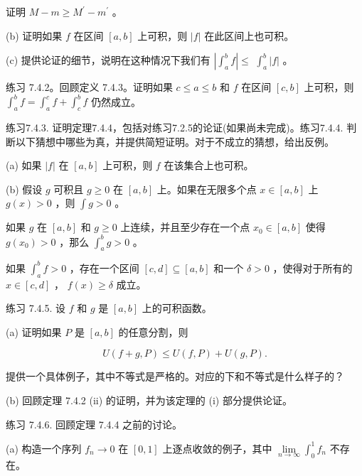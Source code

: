 证明 \(M - m \geq  {M}^{\prime } - {m}^{\prime }\) 。

(b) 证明如果 \(f\) 在区间 \(\left\lbrack  {a,b}\right\rbrack\) 上可积，则 \(\left| f\right|\) 在此区间上也可积。

(c) 提供论证的细节，说明在这种情况下我们有 \(\left| {{\int }_{a}^{b}f}\right|  \leq\)  \({\int }_{a}^{b}\left| f\right|\) 。

练习 7.4.2。回顾定义 7.4.3。证明如果 \(c \leq  a \leq  b\) 和 \(f\) 在区间 \(\left\lbrack  {c,b}\right\rbrack\) 上可积，则 \({\int }_{a}^{b}f = {\int }_{a}^{c}f + {\int }_{c}^{b}f\) 仍然成立。

练习7.4.3. 证明定理7.4.4，包括对练习7.2.5的论证(如果尚未完成)。练习7.4.4. 判断以下猜想中哪些为真，并提供简短证明。对于不成立的猜想，给出反例。

(a) 如果 \(\left| f\right|\) 在 \(\left\lbrack  {a,b}\right\rbrack\) 上可积，则 \(f\) 在该集合上也可积。

(b) 假设 \(g\) 可积且 \(g \geq  0\) 在 \(\left\lbrack  {a,b}\right\rbrack\) 上。如果在无限多个点 \(x \in  \left\lbrack  {a,b}\right\rbrack\) 上 \(g\left( x\right)  > 0\) ，则 \(\int g > 0\) 。

如果 \(g\) 在 \(\left\lbrack  {a,b}\right\rbrack\) 和 \(g \geq  0\) 上连续，并且至少存在一个点 \({x}_{0} \in  \left\lbrack  {a,b}\right\rbrack\) 使得 \(g\left( {x}_{0}\right)  > 0\) ，那么 \({\int }_{a}^{b}g > 0\) 。

如果 \({\int }_{a}^{b}f > 0\) ，存在一个区间 \(\left\lbrack  {c,d}\right\rbrack   \subseteq  \left\lbrack  {a,b}\right\rbrack\) 和一个 \(\delta  > 0\) ，使得对于所有的 \(x \in  \left\lbrack  {c,d}\right\rbrack\) ， \(f\left( x\right)  \geq  \delta\) 成立。

练习 7.4.5. 设 \(f\) 和 \(g\) 是 \(\left\lbrack  {a,b}\right\rbrack\) 上的可积函数。

(a) 证明如果 \(P\) 是 \(\left\lbrack  {a,b}\right\rbrack\) 的任意分割，则

\[
U\left( {f + g,P}\right)  \leq  U\left( {f,P}\right)  + U\left( {g,P}\right) .
\]

提供一个具体例子，其中不等式是严格的。对应的下和不等式是什么样子的？

(b) 回顾定理 7.4.2 (ii) 的证明，并为该定理的 (i) 部分提供论证。

练习 7.4.6. 回顾定理 7.4.4 之前的讨论。

(a) 构造一个序列 \({f}_{n} \rightarrow  0\) 在 \(\left\lbrack  {0,1}\right\rbrack\) 上逐点收敛的例子，其中 \(\mathop{\lim }\limits_{{n \rightarrow  \infty }}{\int }_{0}^{1}{f}_{n}\) 不存在。

